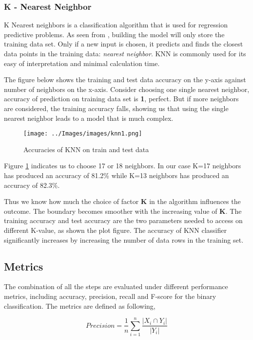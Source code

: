 \documentclass[conference]{IEEEtran}
\begin{document}
\subsubsection*{K - Nearest Neighbor}
K Nearest neighbors is a classification algorithm that is used for regression predictive problems. As seen from \cite{knn}, building the model will only store the training data set. Only if a new input is chosen, it predicts and finds the closest data points in the training data: \textit{nearest neighbor}. KNN is commonly used for its easy of interpretation and minimal calculation time.
\par
The figure below shows the training and test data accuracy on the y-axis against number of neighbors on the x-axis. Consider choosing one single nearest neighbor, accuracy of prediction on training data set is \textbf{1}, perfect. But if more neighbors are considered, the training accuracy falls, showing us that using the single nearest neighbor leads to a model that is much complex.


\begin{figure}[h!]
	\centering
	\texttt{[image: ../Images/images/knn1.png]}
	\caption{Accuracies of KNN on train and test data}
	\label{fig:knn}
\end{figure}
\par
Figure \ref{fig:knn} indicates us to choose 17 or 18 neighbors. In our case K=17 neighbors has produced an accuracy of 81.2\% while K=13 neighbors has produced an accuracy of 82.3\%.


Thus we know how much the choice of factor \textbf{K} in the algorithm influences the outcome. The boundary becomes smoother with the increasing value of \textbf{K}. The training accuracy and test accuracy are the two parameters needed to access on different K-value, as shown the plot figure. The accuracy of KNN classifier significantly increases by increasing the number of data rows in the training set.


\subsection{Metrics}
\label{sec:metrics}
The combination of all the steps are evaluated under different performance metrics, including accuracy, precision, recall and F-score for the binary classification. The metrics are defined as following,

\begin{equation}
Precision = \frac{1}{n}\sum\limits_{i=1}^{n} \frac{|X_i \cap Y_i|}{|Y_i|}
\end{equation}
\end{document}
